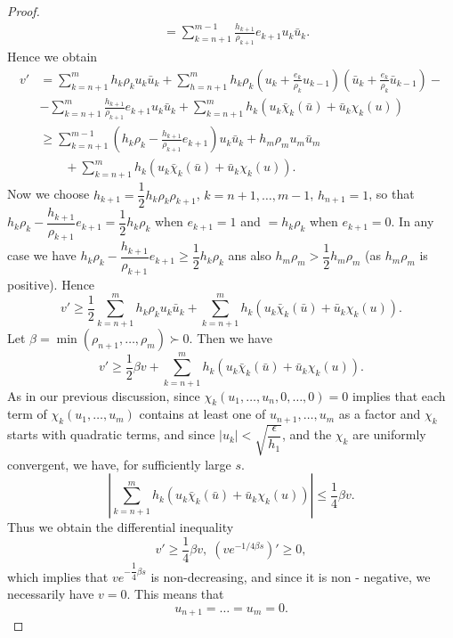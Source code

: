 \begin{proof}
\begin{align*}
& = \sum\limits^{m-1}_{k=n+1} \frac{h_{k+1}}{\rho_{k+1}} e_{k+1} u_k
\bar{u}_k. 
\end{align*}\pageoriginale
Hence we obtain
\begin{align*}
v' & = \sum\limits^m_{k=n+1} h_k \rho_k u_k \bar{u}_k +
\sum\limits^m_{h=n+1} h_k \rho_k (u_k+ \frac{e_k}{\rho_k}
u_{k-1})(\bar{u}_k + \frac{e_k}{\rho_k}\bar{u}_{k-1}) -\\ 
& - \sum\limits^m_{k=n+1} \frac{h_{k+1}}{\rho_{k+1}} e_{k+1} u_k
\bar{u}_k + \sum\limits^m_{k=n+1} h_k (u_k \bar{\chi}_k (\bar{u}) +
\bar{u}_k \chi_k(u))\\ 
& \geq \sum\limits^{m-1}_{k=n+1} (h_k \rho_k-
\frac{h_{k+1}}{\rho_{k+1}} e_{k+1}) u_k \bar{u}_k + h_m \rho_m u_m
\bar{u}_m\\ 
&\qquad + \sum\limits^m_{k=n+1} h_k (u_k\bar{\chi}_k(\bar{u}) +
\bar{u}_k \chi_k (u)).  
\end{align*}
Now we choose $h_{k+1} = \dfrac{1}{2} h_k \rho_k \rho_{k+1}$, $k=n+1,
\ldots, m-1$, $h_{n+1} =1$, so that $h_k \rho_k -
\dfrac{h_{k+1}}{\rho_{k+1}} e_{k+1} = \dfrac{1}{2} h_k \rho_k$ when
$e_{k+1} = 1$ and $= h_k \rho_k$ when $e_{k+1} = 0$. In any case we
have $h_k \rho_k - \dfrac{h_{k+1}}{\rho_{k+1}} e_{k+1} \geq
\dfrac{1}{2} h_{k} \rho_k $ ans also $h_m \rho_m > \dfrac{1}{2} h_m
\rho_m$ (as $h_m \rho_m$ is positive). Hence 
$$
v' \geq \frac{1}{2} \sum\limits^m_{k=n+1} h_k \rho_k u_k \bar{u}_k +
\sum\limits^m_{k=n+1} h_k  (u_k \bar{\chi}_k (\bar{u}) + \bar{u}_k
\chi_k (u)). 
$$
Let $\beta = \min (\rho_{n+1}, \ldots, \rho_m) \succ 0$. Then we have 
$$
v' \geq \frac{1}{2} \beta v + \sum\limits^m_{k=n+1} h_k (u_k
\bar{\chi}_k (\bar{u}) + \bar{u}_k \chi_k (u)).  
$$
As in our previous discussion, since $\chi_k(u_1, \ldots, u_n, 0,
\ldots, 0) = 0$ implies that each term of $\chi_k (u_1, \ldots, u_m)$
contains at least one of $u_{n+1}, \ldots, u_m$ as a factor and
$\chi_k$ starts with quadratic terms, and since $|u_k| <
\sqrt{\dfrac{\epsilon}{h_1}}$, and the $\chi_k$ are uniformly
convergent, we have, for sufficiently large $s$. 
$$
|\sum\limits^m_{k=n+1} h_k (u_k \bar{\chi}_k (\bar{u}) + \bar{u}_k
\chi_k (u))| \leq \frac{1}{4} \beta v. 
$$\pageoriginale
Thus we obtain the differential inequality 
$$
v' \geq \frac{1}{4} \beta v, \; (ve^{-1/4 \beta s})' \geq 0,
$$
which implies that $ve^{-\dfrac{1}{4} \beta s}$ is non-decreasing, and
since it is non - negative, we necessarily have $v=0$. This means that  
$$
u_{n+1}  = \ldots = u_m=0.
$$


\end{proof}
